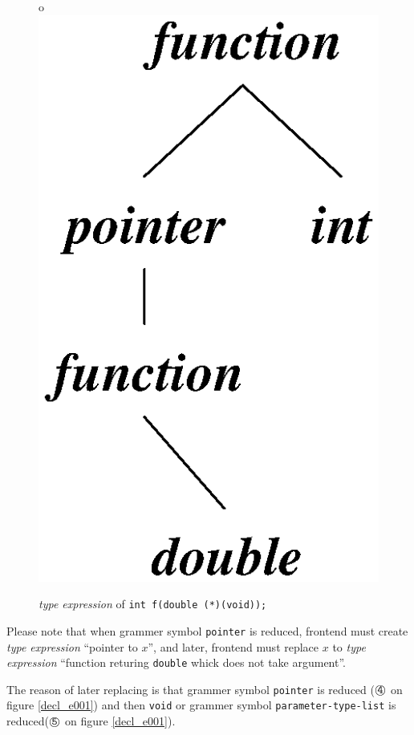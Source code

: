 \begin{figure}[htbp]
\begin{center}
o%
\includegraphics[width=0.5\linewidth,height=0.6\linewidth]{decl002.eps}
\caption{{\em type expression} of {\tt{int f(double (*)(void));}}}
\label{decl_e002}
\end{center}
\end{figure}

Please note that when grammer symbol {\tt{pointer}} is reduced, frontend 
must create {\em type expression} ``pointer to $x$'',
and later, frontend must replace $x$ to {\em type expression} 
``function returing {\tt{double}} whick does not take argument''.

The reason of later replacing is that
grammer symbol {\tt{pointer}} is reduced
 (${\MARU{\tt 4}}$ on figure \ref{decl_e001})
and then {\tt{void}} or grammer symbol {\tt{parameter-type-list}} 
is reduced(${\MARU{\tt 5}}$ on figure \ref{decl_e001}).

